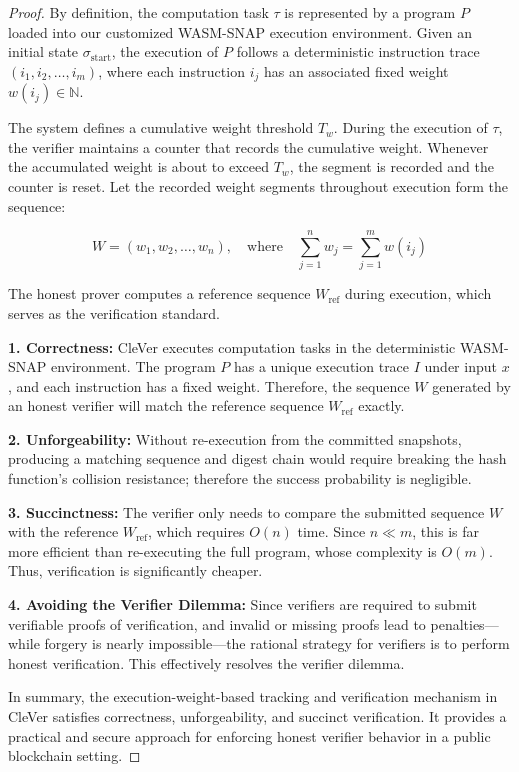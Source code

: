 \documentclass[3p]{elsarticle}
\theoremstyle{remark}
\begin{document}
\begin{proof}
By definition, the computation task $\tau$ is represented by a program $P$ loaded into our customized WASM-SNAP execution environment. Given an initial state $\sigma_{\text{start}}$, the execution of $P$ follows a deterministic instruction trace $(i_1, i_2, \ldots, i_m)$, where each instruction $i_j$ has an associated fixed weight $w(i_j) \in \mathbb{N}$.

The system defines a cumulative weight threshold $T_w$. During the execution of $\tau$, the verifier maintains a counter that records the cumulative weight. Whenever the accumulated weight is about to exceed $T_w$, the segment is recorded and the counter is reset. Let the recorded weight segments throughout execution form the sequence:

\[
W = (w_1, w_2, \ldots, w_n), \quad \text{where} \quad \sum_{j=1}^{n} w_j = \sum_{j=1}^{m} w(i_j)
\]

The honest prover computes a reference sequence $W_{\text{ref}}$ during execution, which serves as the verification standard.

\textbf{1. Correctness:}  
CleVer executes computation tasks in the deterministic WASM-SNAP environment. The program $P$ has a unique execution trace $I$ under input $x$, and each instruction has a fixed weight. Therefore, the sequence $W$ generated by an honest verifier will match the reference sequence $W_{\text{ref}}$ exactly.

\textbf{2. Unforgeability:}  
Without re-execution from the committed snapshots, producing a matching sequence and digest chain would require breaking the hash function’s collision resistance; therefore the success probability is negligible.


\textbf{3. Succinctness:}  
The verifier only needs to compare the submitted sequence $W$ with the reference $W_{\text{ref}}$, which requires $O(n)$ time. Since $n \ll m$, this is far more efficient than re-executing the full program, whose complexity is $O(m)$. Thus, verification is significantly cheaper.

\textbf{4. Avoiding the Verifier Dilemma:}  
Since verifiers are required to submit verifiable proofs of verification, and invalid or missing proofs lead to penalties—while forgery is nearly impossible—the rational strategy for verifiers is to perform honest verification. This effectively resolves the verifier dilemma.

In summary, the execution-weight-based tracking and verification mechanism in CleVer satisfies correctness, unforgeability, and succinct verification. It provides a practical and secure approach for enforcing honest verifier behavior in a public blockchain setting.
\end{proof}
\end{document}
